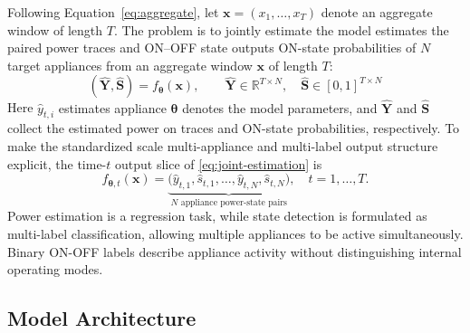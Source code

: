 \documentclass[journal]{IEEEtran}
\providecommand{\DIFadd}[1]{{\protect\color{blue} \sf #1}} %
\providecommand{\DIFdel}[1]{{\protect\color{red} \scriptsize #1}} %
\providecommand{\DIFaddbegin}{} %
\providecommand{\DIFaddend}{} %
\providecommand{\DIFdelbegin}{} %
\providecommand{\DIFdelend}{} %
\providecommand{\DIFscaledelfig}{0.5}
\newlength{\DIFdelgraphicswidth} %
\newlength{\DIFdelgraphicsheight} %
\providecommand{\DIFaddincludegraphics}[2][]{{\color{blue}\fbox{\DIFOincludegraphics[#1]{#2}}}} %
\providecommand{\DIFdelincludegraphics}[2][]{%
\sbox{\DIFdelgraphicsbox}{\DIFOincludegraphics[#1]{#2}}%
\settoboxwidth{\DIFdelgraphicswidth}{\DIFdelgraphicsbox} %
\settoboxtotalheight{\DIFdelgraphicsheight}{\DIFdelgraphicsbox} %
\scalebox{\DIFscaledelfig}{%
\parbox[b]{\DIFdelgraphicswidth}{\usebox{\DIFdelgraphicsbox}\\[-\baselineskip] \rule{\DIFdelgraphicswidth}{0em}}\llap{\resizebox{\DIFdelgraphicswidth}{\DIFdelgraphicsheight}{%
\setlength{\unitlength}{\DIFdelgraphicswidth}%
\begin{picture}(1,1)%
\thicklines\linethickness{2pt} %
{\color[rgb]{1,0,0}\put(0,0){\framebox(1,1){}}}%
{\color[rgb]{1,0,0}\put(0,0){\line( 1,1){1}}}%
{\color[rgb]{1,0,0}\put(0,1){\line(1,-1){1}}}%
\end{picture}%
}\hspace*{3pt}}} %
} %
\DeclareRobustCommand{\DIFaddbegin}{\DIFOaddbegin \let\includegraphics\DIFaddincludegraphics} %
\DeclareRobustCommand{\DIFaddend}{\DIFOaddend \let\includegraphics\DIFOincludegraphics} %
\DeclareRobustCommand{\DIFdelbegin}{\DIFOdelbegin \let\includegraphics\DIFdelincludegraphics} %
\DeclareRobustCommand{\DIFdelend}{\DIFOaddend \let\includegraphics\DIFOincludegraphics} %
\begin{document}
Following \DIFaddbegin \DIFadd{Equation~}\DIFaddend \eqref{eq:aggregate}, \DIFaddbegin \DIFadd{let $\mathbf{x}=(x_1,\ldots,x_T)$ denote an aggregate window of length $T$. The problem is to jointly estimate }\DIFaddend the \DIFdelbegin \DIFdel{model estimates the paired }\DIFdelend power \DIFaddbegin \DIFadd{traces }\DIFaddend and \DIFdelbegin \DIFdel{ON--OFF state outputs }\DIFdelend \DIFaddbegin \DIFadd{ON-state probabilities }\DIFaddend of $N$ target appliances\DIFdelbegin \DIFdel{from an aggregate window $\mathbf{x}$ of length $T$}\DIFdelend :
\DIFdelbegin %
\DIFdelend \DIFaddbegin \begin{equation}
\left(\hat{\mathbf{Y}},\hat{\mathbf{S}}\right)=f_{\boldsymbol{\theta}}(\mathbf{x}),
\qquad
\hat{\mathbf{Y}}\in\mathbb{R}^{T\times N},\quad
\hat{\mathbf{S}}\in[0,1]^{T\times N}
\label{eq:joint-estimation}
\end{equation}\DIFaddend 
Here \DIFdelbegin \DIFdel{$\hat y_{t,i}$ estimates appliance }\DIFdelend \DIFaddbegin \DIFadd{$\boldsymbol{\theta}$ denotes the model parameters, and $\hat{\mathbf{Y}}$ and $\hat{\mathbf{S}}$ collect the estimated }\DIFaddend power \DIFdelbegin \DIFdel{on }\DIFdelend \DIFaddbegin \DIFadd{traces and ON-state probabilities, respectively. To make }\DIFaddend the \DIFdelbegin \DIFdel{standardized scale}\DIFdelend \DIFaddbegin \DIFadd{multi-appliance and multi-label output structure explicit}\DIFaddend , \DIFaddbegin \DIFadd{the time-$t$ output slice of \eqref{eq:joint-estimation} is
}\begin{equation}
f_{\boldsymbol{\theta},t}(\mathbf{x})=
\underbrace{\bigl(\hat y_{t,1},\hat s_{t,1},\ldots,
\hat y_{t,N},\hat s_{t,N}\bigr)}_{N\text{ appliance power-state pairs}},
\quad t=1,\ldots,T.
\label{eq:paired-outputs}
\end{equation}
Power estimation is a regression task, while state detection is formulated as multi-label classification, allowing multiple appliances to be active simultaneously. Binary ON-OFF labels describe appliance activity without distinguishing internal operating modes.

\subsection{Model Architecture}
\label{sec:architecture}
\end{document}
